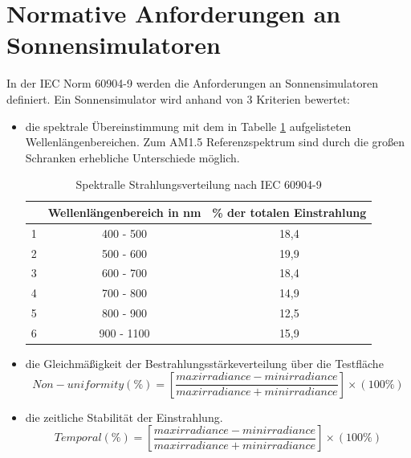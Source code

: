 \documentclass[a4paper,bibtotoc,oneside]{scrbook}
\begin{document}
\section{Normative Anforderungen an Sonnensimulatoren}\thispagestyle{empty}
In der IEC Norm 60904-9 \cite{norm9} werden die Anforderungen an Sonnensimulatoren definiert. Ein Sonnensimulator wird anhand von 3 Kriterien bewertet: 
\begin{itemize}
\item die spektrale Übereinstimmung mit dem in Tabelle \ref{TabS1} aufgelisteten Wellenlängenbereichen. Zum AM1.5 Referenzspektrum sind durch die großen Schranken erhebliche Unterschiede möglich.
\begin{table}[htbp]
\centering
\begin{tabular}{ | c | c | c |}\hline
{\bf } & {\bf Wellenlängenbereich in nm} & {\bf \% der totalen Einstrahlung}\\ \hline
\hline
1  & 400 - 500 & 18,4 \\ \hline
2  & 500 - 600 & 19,9\\ \hline
3  & 600 - 700 & 18,4\\ \hline
4  & 700 - 800 & 14,9\\ \hline
5  & 800 - 900 & 12,5\\ \hline
6  & 900 - 1100 & 15,9\\ \hline
\end{tabular}
\caption{Spektralle Strahlungsverteilung nach IEC 60904-9}\label{TabS1}
\end{table}
\item die Gleichmäßigkeit der Bestrahlungsstärkeverteilung über die Testfläche
	\begin{equation}
 Non-uniformity (\%) = [\frac{max irradiance - min irradiance}{max irradiance + min irradiance}] \times (100\%)
\end{equation}
\item die zeitliche Stabilität der Einstrahlung.
\begin{equation}
 Temporal (\%) = [\frac{max irradiance - min irradiance}{max irradiance + min irradiance}] \times (100\%)
\end{equation}
\end{itemize}
\end{document}
